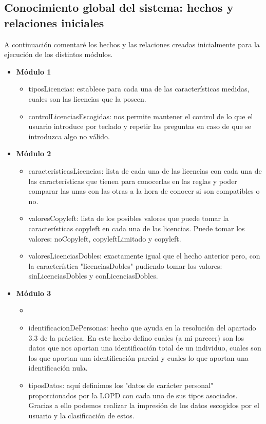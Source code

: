 \subsection{Conocimiento global del sistema: hechos y relaciones iniciales}
A continuación comentaré los hechos y las relaciones creadas inicialmente para la ejecución de los distintos módulos.
\begin{itemize}
	\item \textbf{Módulo 1}
		\begin{itemize}
			\item tiposLicencias: establece para cada una de las características medidas, cuales son las licencias que la poseen.
			\item controlLicenciasEscogidas: nos permite mantener el control de lo que el usuario introduce por teclado y repetir las preguntas en caso de que se introduzca algo no válido.
		\end{itemize}
	\item \textbf{Módulo 2}
		\begin{itemize}
			\item caracteristicasLicencias: lista de cada una de las licencias con cada una de las características que tienen para conocerlas en las reglas y poder comparar las unas con las otras a la hora de conocer si son compatibles o no.
			\item valoresCopyleft: lista de los posibles valores que puede tomar la características copyleft en cada una de las licencias. Puede tomar los valores: noCopyleft, copyleftLimitado y copyleft.
			\item valoresLicenciasDobles: exactamente igual que el hecho anterior pero, con la característica "licenciasDobles" pudiendo tomar los valores: sinLicenciasDobles y conLicenciasDobles.
		\end{itemize}
	\item \textbf{Módulo 3}
		\begin{itemize}
			\item 
			\item identificacionDePersonas: hecho que ayuda en la resolución del apartado 3.3 de la práctica. En este hecho defino cuales (a mi parecer) son los datos que nos aportan una identificación total de un individuo, cuales son los que aportan una identificación parcial y cuales lo que aportan una identificación nula.
			\item tiposDatos: aquí definimos los "datos de carácter personal" proporcionados por la LOPD con cada uno de sus tipos asociados. Gracias a ello podemos realizar la impresión de los datos escogidos por el usuario y la clasificación de estos.

\end{itemize}
\end{itemize}
